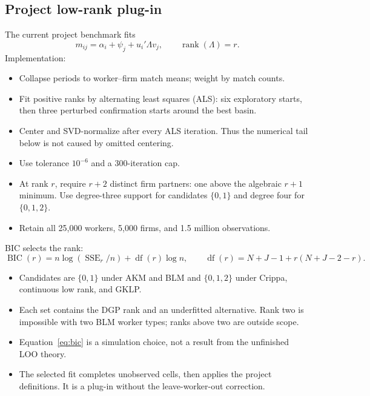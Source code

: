 \documentclass[11pt]{article}
\begin{document}
\subsection{Project low-rank plug-in}

The current project benchmark fits
\begin{equation}
m_{ij}=\alpha_i+\psi_j+u_i'\Lambda v_j,
\qquad \operatorname{rank}(\Lambda)=r. \label{eq:lowrank}
\end{equation}
Implementation:
\begin{itemize}
\item Collapse periods to worker--firm match means; weight by match counts.
\item Fit positive ranks by alternating least squares (ALS): six exploratory
starts, then three perturbed confirmation starts around the best basin.
\item Center and SVD-normalize after every ALS iteration.  Thus the numerical
tail below is not caused by omitted centering.
\item Use tolerance $10^{-6}$ and a 300-iteration cap.
\item At rank $r$, require $r+2$ distinct firm partners: one above the
algebraic $r+1$ minimum.  Use degree-three support for candidates $\{0,1\}$
and degree four for $\{0,1,2\}$.
\item Retain all 25,000 workers, 5,000 firms, and 1.5 million observations.
\end{itemize}

BIC selects the rank:
\begin{equation}
\operatorname{BIC}(r)=n\log(\operatorname{SSE}_r/n)
+\operatorname{df}(r)\log n,
\qquad
\operatorname{df}(r)=N+J-1+r(N+J-2-r). \label{eq:bic}
\end{equation}
\begin{itemize}
\item Candidates are $\{0,1\}$ under AKM and BLM and $\{0,1,2\}$ under
Crippa, continuous low rank, and GKLP.
\item Each set contains the DGP rank and an underfitted alternative.  Rank two
is impossible with two BLM worker types; ranks above two are outside scope.
\item Equation~\eqref{eq:bic} is a simulation choice, not a result from the
unfinished LOO theory.
\item The selected fit completes unobserved cells, then applies the project
definitions.  It is a plug-in without the leave-worker-out correction.
\end{itemize}
\end{document}
